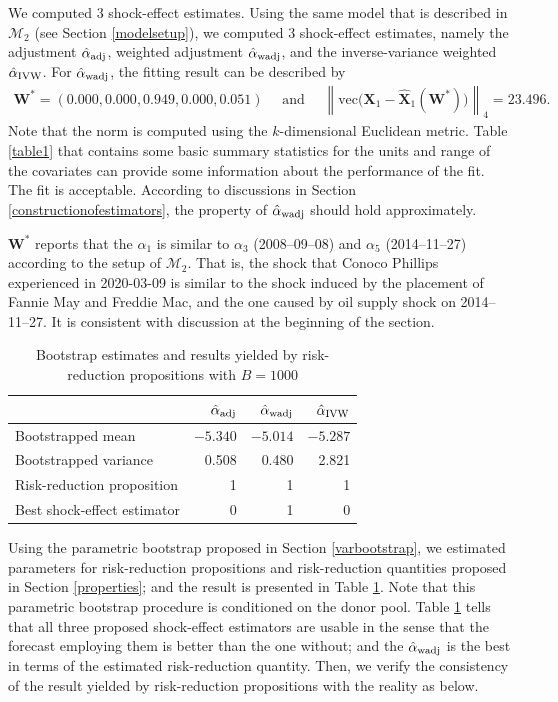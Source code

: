 \documentclass[11pt]{article}
\def\mbf#1{\mathbf{#1}} %
\def\mrm#1{\mathrm{#1}} %
\def\mc#1{\mathcal{#1}} %
\newcommand{\norm}[1]{\left\lVert#1\right\rVert} %
\theoremstyle{definition}
\begin{document}
We computed 3 shock-effect estimates. Using the same model that is described in $\mc{M}_{2}$ (see Section \ref{modelsetup}), we computed 3 shock-effect estimates, namely the adjustment  $\hat{\alpha}_{\rm adj}$, weighted adjustment $\hat{\alpha}_{\rm wadj}$, and the inverse-variance weighted $\hat{\alpha}_{\rm IVW}$. For $\hat{\alpha}_{\rm wadj}$, the fitting result can be described by
\begin{align*}
 \mathbf{W}^*= (0.000,0.000, 0.949, 0.000, 0.051) \quad \text{ and } \quad  \norm{\mrm{vec}\big(\mbf{X}_1-\hat{\mbf{X}}_1(\mbf{W}^*)\big)}_{4} = 23.496.
\end{align*}
Note that the norm is computed using the $k$-dimensional Euclidean metric. Table \ref{table1} that contains some basic summary statistics for the units and range of the covariates can provide some information about the performance of the fit. The fit is acceptable. According to discussions in Section \ref{constructionofestimators}, the property of $\hat{\alpha}_{\rm wadj}$ should hold approximately.

$\mathbf{W}^*$ reports that the $\alpha_1$ is similar to $\alpha_3$ (2008--09--08) and $\alpha_5$ (2014--11--27) according to the setup of $\mc{M}_2$. That is, the shock that Conoco Phillips experienced in 2020-03-09 is similar to the shock induced by the placement of Fannie May and Freddie Mac, and the one caused by oil supply shock on 2014--11--27. It is consistent with discussion at the beginning of the section.
\begin{table}[H]
  \caption{Bootstrap estimates and results yielded by risk-reduction propositions with $B = 1000$}\label{table2}
  \begin{center}
    \begin{tabular}{lrrr}
      & $\hat{\alpha}_{\rm adj}$ & $\hat{\alpha}_{\rm wadj}$ & $\hat{\alpha}_{\rm IVW}$ \\
      \hline 
    Bootstrapped mean  & $-5.340$ & $-5.014$ & $-5.287$ \\
    Bootstrapped variance & 0.508 & 0.480 & 2.821 \\
    Risk-reduction proposition & 1 & 1 & 1 \\
    Best shock-effect estimator & 0 & 1 & 0
    \end{tabular}
  \end{center}  
\end{table}
\vspace{-.5cm}

Using the parametric bootstrap proposed in Section \ref{varbootstrap}, we estimated parameters for risk-reduction propositions and risk-reduction quantities proposed in  Section \ref{properties}; and the result is presented in Table \ref{table2}. Note that this parametric bootstrap procedure is conditioned  on the  donor pool. Table \ref{table2} tells that all three proposed  shock-effect estimators are usable in the sense that the forecast employing them is better than the one without; and the $\hat{\alpha}_{\rm wadj}$ is the best in terms of the estimated risk-reduction quantity. Then, we verify the consistency of the result yielded by risk-reduction propositions with the reality as below.
\end{document}
